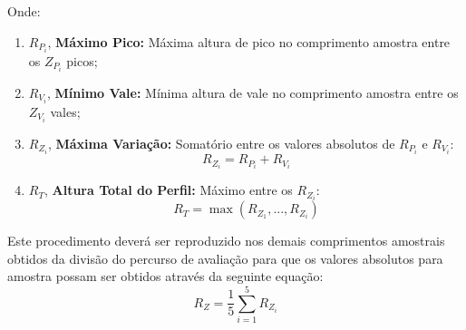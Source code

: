 \documentclass{article}
\begin{document}
            Onde:
                \begin{enumerate}[rightmargin = \leftmargin, noitemsep]
                    \item $R_{P_{i}}$, \textbf{Máximo Pico:} Máxima altura de pico no comprimento amostra entre os $Z_{P_{i}}$ picos;

                    \item $R_{V_{i}}$, \textbf{Mínimo Vale:} Mínima altura de vale no comprimento amostra entre os $Z_{V_{i}}$ vales;

                    \item $R_{Z_{i}}$, \textbf{Máxima Variação:} Somatório entre os valores absolutos de $R_{P_{i}}$ e $R_{V_{i}}$:
                        \begin{equation}
                            \boxed{
                                R_{Z_{i}} = R_{P_{i}} + R_{V_{i}}
                            }
                        \end{equation}

                    \item $R_{T}$, \textbf{Altura Total do Perfil:} Máximo entre os $R_{Z_{i}}$:
                        \begin{equation}
                            \boxed{
                                R_{T} = \max(R_{Z_{1}}, ..., R_{Z_{i}})
                            }
                        \end{equation}
                \end{enumerate}
            Este procedimento deverá ser reproduzido nos demais comprimentos amostrais obtidos da divisão do percurso de avaliação para que os valores absolutos para amostra possam ser obtidos através da seguinte equação:
                \begin{equation}
                    \boxed{
                        R_{Z} = \frac{1}{5} \sum_{i=1}^{5} R_{Z_{i}}
                    }
                \end{equation}
\end{document}
